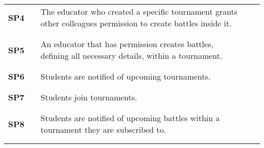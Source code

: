 \begin{longtable}[H]{l l p{8.5cm} l l}
    \textbf{SP4}   & \vline & The educator who created a specific tournament grants other colleagues permission to create battles inside it.                    & \vline &                        \\
                   &        &                                                                                                                                   &        &                        \\\hline & & \\
    \textbf{SP5}   & \vline & An educator that has permission creates battles, defining all necessary details, within a tournament.                             & \vline &                        \\
                   &        &                                                                                                                                   &        &                        \\\hline & & \\
    \textbf{SP6}   & \vline & Students are notified of upcoming tournaments.                                                                                    & \vline &                        \\
                   &        &                                                                                                                                   &        &                        \\\hline & & \\
    \textbf{SP7}   & \vline & Students join tournaments.                                                                                                        & \vline &                        \\
                   &        &                                                                                                                                   &        &                        \\\hline & & \\
    \textbf{SP8}   & \vline & Students are notified of upcoming battles within a tournament they are subscribed to.                                             & \vline &                        \\
                   &        &                                                                                                                                   &        &                        \\\hline & & \\

\end{longtable}
